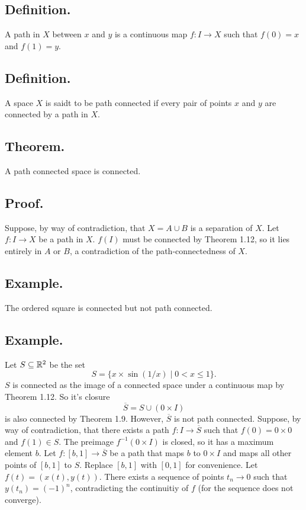 \documentclass[titlepage]{article}
\begin{document}
\subsection{Definition.} A path in $X$ between $x$ and $y$ is a continuous map $f: I \to X$ such that $f(0) = x$ and $f(1) = y$.

\subsection{Definition.} A space $X$ is saidt to be path connected if every pair of points $x$ and $y$ are connected by a path in $X$.

\subsection{Theorem.} A path connected space is connected.

\subsection{Proof.} Suppose, by way of contradiction, that $X = A \cup B$ is a separation of $X$. Let $f: I \to X$ be a path in $X$. $f(I)$ must be connected by Theorem 1.12, so it lies entirely in $A$ or $B$, a contradiction of the path-connectedness of $X$.

\subsection{Example.} The ordered square is connected but not path connected.

\subsection{Example.} Let $S \subseteq \mathbb{R}^{2}$ be the set 
$$S = \{x \times \sin(1/x) \mid 0 < x \leq 1\}.$$
$S$ is connected as the image of a connected space under a continuous map by Theorem 1.12. So it's closure 
$$\overline{S} = S \cup (0 \times I)$$
is also connected by Theorem 1.9. However, $\overline{S}$ is not path connected. Suppose, by way of contradiction, that there exists a path $f: I \to \overline{S}$ such that $f(0) = 0 \times 0$ and $f(1) \in S$. The preimage $f^{-1}(0 \times I)$ is closed, so it has a maximum element $b$. Let $f: [b, 1] \to \overline{S}$ be a path that maps $b$ to $0 \times I$ and maps all other points of $[b, 1]$ to $S$. Replace $[b, 1]$ with $[0, 1]$ for convenience. Let $f(t) = (x(t), y(t))$. There exists a sequence of points $t_{n} \to 0$ such that $y(t_{n}) = (-1)^{n}$, contradicting the continuitiy of $f$ (for the sequence does not converge).
\end{document}
